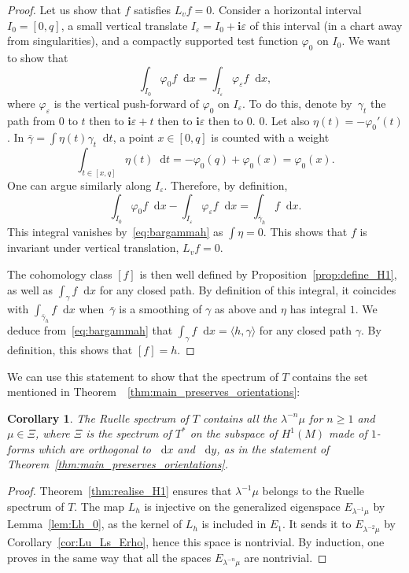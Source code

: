 \documentclass[10pt]{amsart}
\newcommand{\dd}{\mathop{}\!\mathrm{d}}
\newcommand{\ic}{\mathbf{i}}
\let\epsilon\varepsilon
\let\phi\varphi
\newtheorem{cor}[thm]{Corollary}
\theoremstyle{definition}
\numberwithin{equation}{section}
\begin{document}
\begin{proof}
Let us show that $f$ satisfies $L_v f = 0$. Consider a horizontal interval
$I_0 = [0, q]$, a small vertical translate $I_\epsilon = I_0+\ic \epsilon$ of
this interval (in a chart away from singularities), and a compactly supported
test function $\phi_0$ on $I_0$. We want to show that
\[
\int_{I_0} \phi_0 f
\dd x = \int_{I_\epsilon} \phi_\epsilon f \dd x,
\]
where $\phi_\epsilon$ is the
vertical push-forward of $\phi_0$ on $I_\epsilon$. To do this, denote by~$\gamma_t$ the path from $0$ to $t$ then to $\ic \epsilon+t$ then to
$\ic\epsilon$ then to $0$. $0$. Let also \hbox{$\eta(t) = -\phi_0'(t)$}. In
$\bar\gamma=\int \eta(t) \gamma_t \dd t$, a point $x \in [0,q]$ is counted
with a weight
\[
\int_{t \in [x,q]} \eta(t) \dd t = -\phi_0(q) + \phi_0(x) =
\phi_0(x).
\]
One can argue similarly along $I_\epsilon$. Therefore, by
definition,
\[
\int_{I_0} \phi_0 f \dd x - \int_{I_\epsilon} \phi_\epsilon f
\dd x = \int_{\bar \gamma_h} f \dd x.
\]
This integral vanishes
by~\eqref{eq:bargammah} as $\int \eta=0$. This shows that $f$ is invariant
under vertical translation, \ie $L_v f = 0$.

The cohomology class $[f]$ is then well defined by
Proposition~\ref{prop:define_H1}, as well as $\int_\gamma f \dd x$ for any
closed path. By definition of this integral, it coincides with
$\int_{\bar\gamma_h} f \dd x$ when~$\bar\gamma$ is a smoothing of $\gamma$ as
above and $\eta$ has integral $1$. We deduce from~\eqref{eq:bargammah} that
$\int_\gamma f \dd x= \langle h, \gamma \rangle$ for any closed path
$\gamma$. By definition, this shows that $[f] = h$.
\end{proof}

We can use this statement to show that the spectrum of $T$ contains the set
mentioned in Theorem~~\ref{thm:main_preserves_orientations}:

\begin{cor}
\label{cor:spectre_contient} The Ruelle spectrum of $T$ contains all the
$\lambda^{-n} \mu$ for $n\geq 1$ and $\mu \in \Xi$, where $\Xi$ is the
spectrum of $T^*$ on the subspace of $H^1(M)$ made of $1$-forms which are
orthogonal to $\dd x$ and $\dd y$, as in the statement of
Theorem~\ref{thm:main_preserves_orientations}.
\end{cor}
\begin{proof}
Theorem~\ref{thm:realise_H1} ensures that $\lambda^{-1} \mu$ belongs to the
Ruelle spectrum of $T$. The map $L_h$ is injective on the generalized
eigenspace $E_{\lambda^{-1}\mu}$ by Lemma~\ref{lem:Lh_0}, as the kernel of
$L_h$ is included in $E_1$. It sends it to $E_{\lambda^{-2}\mu}$ by
Corollary~\ref{cor:Lu_Ls_Erho}, hence this space is nontrivial. By induction,
one proves in the same way that all the spaces $E_{\lambda^{-n}\mu}$ are
nontrivial.
\end{proof}
\end{document}

